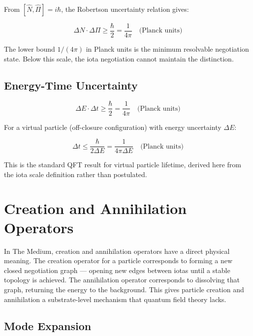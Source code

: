 \documentclass[11pt,letterpaper]{article}
\newenvironment{plainbox}{\begin{tcolorbox}[colback=blue!3!white,colframe=blue!40!white,title={\small\textit{In plain language}},breakable]}{\end{tcolorbox}}
\begin{document}
From \([\hat{N}, \hat{\Pi}] = i\hbar\), the Robertson uncertainty relation gives:

\begin{equation}
\Delta N \cdot \Delta\Pi \geq \frac{\hbar}{2} = \frac{1}{4\pi} \quad \text{(Planck units)}
\end{equation}

The lower bound \(1/(4\pi)\) in Planck units is the minimum resolvable negotiation state. Below this scale, the iota negotiation cannot maintain the distinction.

\subsection{Energy-Time Uncertainty}
\label{sec:org162db85}

\begin{equation}
\Delta E \cdot \Delta t \geq \frac{\hbar}{2} = \frac{1}{4\pi} \quad \text{(Planck units)}
\end{equation}

For a virtual particle (off-closure configuration) with energy uncertainty \(\Delta E\):

\begin{equation}
\Delta t \leq \frac{\hbar}{2\Delta E} = \frac{1}{4\pi\Delta E} \quad \text{(Planck units)}
\end{equation}

This is the standard QFT result for virtual particle lifetime, derived here from the iota scale definition rather than postulated.

\section{Creation and Annihilation Operators}
\label{sec:orgf4dacc5}

\begin{plainbox}
In The Medium, creation and annihilation operators have a direct physical meaning. The creation operator for a particle corresponds to forming a new closed negotiation graph --- opening new edges between iotas until a stable topology is achieved. The annihilation operator corresponds to dissolving that graph, returning the energy to the background. This gives particle creation and annihilation a substrate-level mechanism that quantum field theory lacks.
\end{plainbox}

\subsection{Mode Expansion}
\label{sec:org829cd5e}
\end{document}
